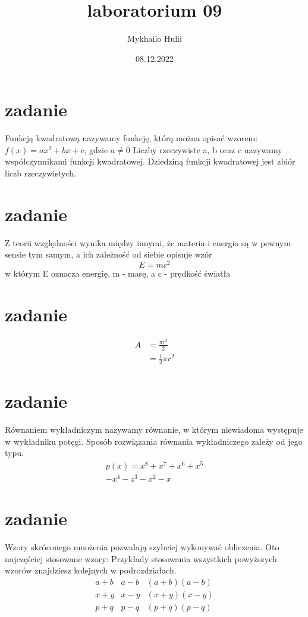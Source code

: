 \documentclass[12pt,b5paper]{article}
\title{laboratorium 09}
\author{Mykhailo Hulii}
\date{08.12.2022}
\begin{document}
	\begin{center}
		\section{zadanie }
		Funkcją kwadratową nazywamy funkcję, którą można opisać wzorem:
		$f(x) = ax^2+bx+c$, gdzie $a \ne 0$
		Liczby rzeczywiste a, b oraz c nazywamy współczynnikami funkcji kwadratowej. Dziedziną funkcji kwadratowej jest zbiór liczb rzeczywistych.
		\section{zadanie}
		Z teorii względności wynika między innymi, że materia i energia są w pewnym sensie tym samym, a ich zależność od siebie opisuje wzór 
		\begin{equation} \label{eqn}
			E = {mc^2}
		\end{equation} w którym E oznacza energię, m - masę, a c - prędkość światła
	\section{zadanie}
		\begin{equation}\label{eq1}
			\begin{split}
				A & = \frac{\pi r^2}{2} \\ & = \frac{1}{2} \pi r^2
			\end{split}
		\end{equation}
	\section{zadanie}
	 Równaniem wykładniczym nazywamy równanie, w którym niewiadoma występuje w wykładniku potęgi. Sposób rozwiązania równania wykładniczego zależy od jego typu. 
			\begin{multline*}
			p(x) = x^8+x^7+x^6+x^5\\- x^4 - z^3 - x^2 - x
		\end{multline*}
	\section{zadanie}
	Wzory skróconego mnożenia pozwalają szybciej wykonywać obliczenia.
	Oto najczęściej stosowane wzory:
	Przykłady stosowania wszystkich powyższych wzorów znajdziesz kolejnych w podrozdziałach.
		\begin{align*}
			a+b & a-b & (a+b)(a-b)\\x+y & x-y & (x+y)(x-y)\\ p+q & p-q & (p+q)(p-q)
		\end{align*}

\end{center}
\end{document}
